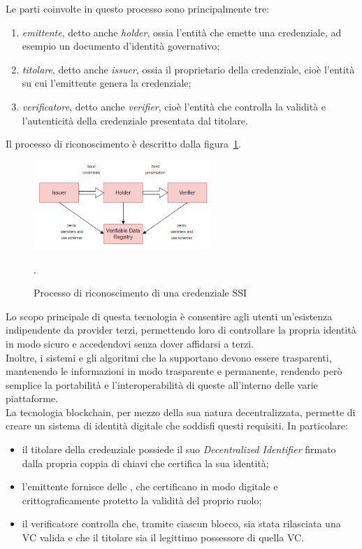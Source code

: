 Le parti coinvolte in questo processo sono principalmente tre:
\begin{enumerate}
    \item {\textit{emittente}, detto anche \textit{holder}}, ossia l'entità che emette una credenziale, ad esempio un documento d'identità governativo;
    \item {\textit{titolare}, detto anche \textit{issuer}}, ossia il proprietario della credenziale, cioè l'entità su cui l'emittente genera la credenziale;
    \item {\textit{verificatore}, detto anche \textit{verifier}}, cioè l'entità che controlla la validità e l'autenticità della credenziale presentata dal titolare.
\end{enumerate}  

Il processo di riconoscimento è descritto dalla figura~\ref{fig:ssi}.

\begin{figure}[ht]
    \centering
    \includegraphics[width=0.6\textwidth, alt={Come funziona il riconoscimento nella SSI}]{immagini/ssi.png}
    \caption{Processo di riconoscimento di una credenziale SSI}\label{fig:ssi}.
\end{figure}

Lo scopo principale di questa tecnologia è consentire agli utenti un'esistenza indipendente da provider terzi, 
permettendo loro di controllare la propria identità in modo sicuro e accedendovi senza dover affidarsi a terzi. \\
Inoltre, i sistemi e gli algoritmi che la supportano devono essere trasparenti, mantenendo le informazioni in modo trasparente e permanente, rendendo però semplice 
la portabilità e l'interoperabilità di queste all'interno delle varie piattaforme. \\

La tecnologia blockchain, per mezzo della sua natura decentralizzata, permette di creare un sistema di identità digitale che soddisfi questi requisiti.
In particolare:
\begin{itemize}
    \item il titolare della credenziale possiede il suo \textit{Decentralized Identifier} firmato dalla propria coppia di chiavi che certifica la sua identità;
    \item l'emittente fornisce delle , che certificano in modo digitale e crittograficamente protetto la validità del proprio ruolo;
    \item il verificatore controlla che, tramite ciascun blocco, sia stata rilasciata una VC valida e che il titolare sia il legittimo possessore di quella VC.\@
\end{itemize}  

